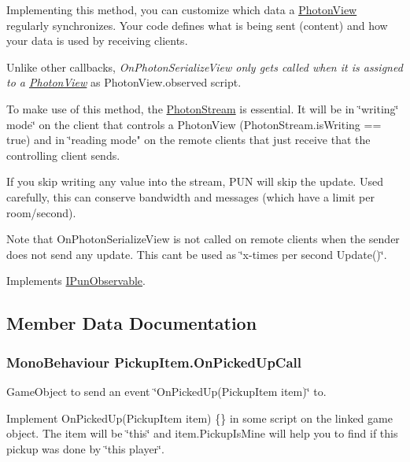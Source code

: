 Implementing this method, you can customize which data a \hyperlink{class_photon_view}{Photon\+View} regularly synchronizes. Your code defines what is being sent (content) and how your data is used by receiving clients.

Unlike other callbacks, {\itshape On\+Photon\+Serialize\+View only gets called when it is assigned to a \hyperlink{class_photon_view}{Photon\+View}} as Photon\+View.\+observed script.

To make use of this method, the \hyperlink{class_photon_stream}{Photon\+Stream} is essential. It will be in \char`\"{}writing\char`\"{} mode\char`\"{} on the
client that controls a Photon\+View (\+Photon\+Stream.\+is\+Writing == true) and in \char`\"{}reading mode" on the remote clients that just receive that the controlling client sends.

If you skip writing any value into the stream, P\+UN will skip the update. Used carefully, this can conserve bandwidth and messages (which have a limit per room/second).

Note that On\+Photon\+Serialize\+View is not called on remote clients when the sender does not send any update. This can\textquotesingle{}t be used as \char`\"{}x-\/times per second Update()\char`\"{}. 

Implements \hyperlink{group__public_api_ga78c69bbb6f79d1e4fb23d3f761eaf4aa}{I\+Pun\+Observable}.



\subsection{Member Data Documentation}
\subsubsection[{\texorpdfstring{On\+Picked\+Up\+Call}{OnPickedUpCall}}]{\setlength{\rightskip}{0pt plus 5cm}Mono\+Behaviour Pickup\+Item.\+On\+Picked\+Up\+Call}\hypertarget{class_pickup_item_a48a1fe620e9fecb4e8825c48723140c4}{}\label{class_pickup_item_a48a1fe620e9fecb4e8825c48723140c4}


Game\+Object to send an event \char`\"{}\+On\+Picked\+Up(\+Pickup\+Item item)\char`\"{} to. 

Implement On\+Picked\+Up(\+Pickup\+Item item) \{\} in some script on the linked game object. The item will be \char`\"{}this\char`\"{} and item.\+Pickup\+Is\+Mine will help you to find if this pickup was done by \char`\"{}this player\char`\"{}. 
